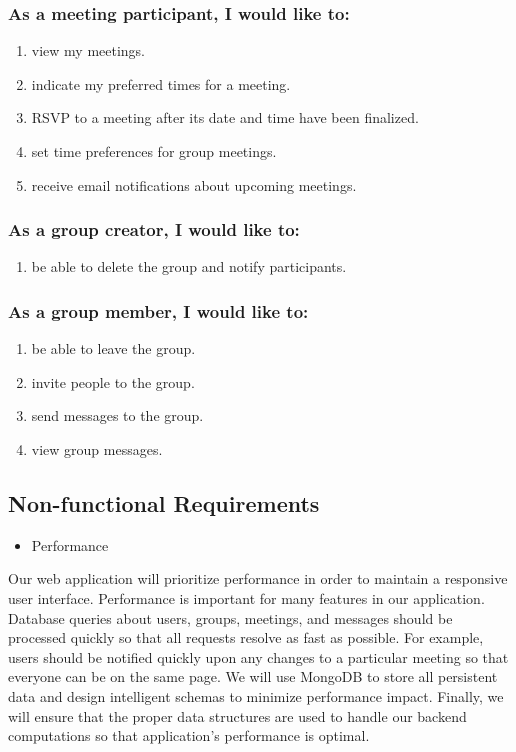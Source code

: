 \documentclass[12pt]{article}
\begin{document}
\subsubsection*{As a meeting participant, I would like to:}

\begin{enumerate}[nolistsep]
    \item view my meetings.
    \item indicate my preferred times for a meeting.
    \item RSVP to a meeting after its date and time have been finalized.
    \item set time preferences for group meetings.
    \item receive email notifications about upcoming meetings.
\end{enumerate}

\subsubsection*{As a group creator, I would like to:}
\begin{enumerate}[nolistsep]
    \item be able to delete the group and notify participants.
\end{enumerate}

\subsubsection*{As a group member, I would like to:}
\begin{enumerate}[nolistsep]
    \item be able to leave the group.
    \item invite people to the group.
    \item send messages to the group.
    \item view group messages.
\end{enumerate}
\newpage
\subsection*{Non-functional Requirements}

\begin{itemize}
\item Performance
\end{itemize}

Our web application will prioritize performance in order to maintain a responsive user interface. Performance is important for many features in our application. Database queries about users, groups, meetings, and messages should be processed quickly so that all requests resolve as fast as possible. For example, users should be notified quickly upon any changes to a particular meeting so that everyone can be on the same page. We will use MongoDB to store all persistent data and design intelligent schemas to minimize performance impact. Finally, we will ensure that the proper data structures are used to handle our backend computations so that application’s performance is optimal.
\end{document}
